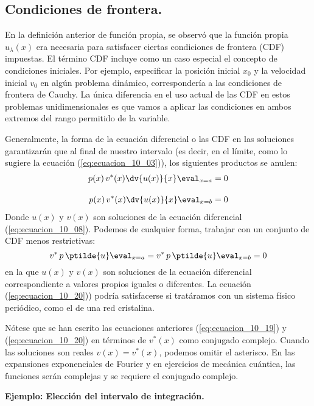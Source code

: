 \subsection{Condiciones de frontera.}
En la definición anterior de función propia, se observó que la función propia $u_{\lambda} (x)$ era necesaria para satisfacer ciertas condiciones de frontera (CDF) impuestas. El término CDF incluye como un caso especial el concepto de condiciones iniciales. Por ejemplo, especificar la posición inicial $x_{0}$ y la velocidad inicial $v_{0}$ en algún problema dinámico, correspondería a las condiciones de frontera de Cauchy. La única diferencia en el uso actual de las CDF en estos problemas unidimensionales es que vamos a aplicar las condiciones en ambos extremos del rango permitido de la variable.
\par
Generalmente, la forma de la ecuación diferencial o las CDF en las soluciones garantizarán que al final de nuestro intervalo (es decir, en el límite, como lo sugiere la ecuación (\ref{eq:ecuacion_10_03})), los siguientes productos se anulen:
\begin{align}
\begin{aligned}
p(x) \, v^{*}(x) \dv{u(x)}{x} \eval_{x = a} = 0 \\[1em]
p(x) \, v^{*}(x) \dv{u(x)}{x} \eval_{x = b} = 0
\label{eq:ecuacion_10_19}
\end{aligned}
\end{align}
Donde $u(x)$ y $v(x)$ son soluciones de la ecuación diferencial (\ref{eq:ecuacion_10_08}). Podemos de cualquier forma, trabajar con un conjunto de CDF menos restrictivas:
\begin{equation}
v^{*} \, p \, \ptilde{u} \eval_{x = a} = v^{*} \, p \, \ptilde{u} \eval_{x = b} = 0
\label{eq:ecuacion_10_20}
\end{equation}
en la que $u(x)$ y $v(x)$ son soluciones de la ecuación diferencial correspondiente a valores propios iguales o diferentes. La ecuación (\ref{eq:ecuacion_10_20})) podría satisfacerse si tratáramos con un sistema físico periódico, como el de una red cristalina.
\par
Nótese que se han escrito las ecuaciones anteriores  (\ref{eq:ecuacion_10_19}) y (\ref{eq:ecuacion_10_20}) en términos de $v^{*}(x)$ como conjugado complejo. Cuando las soluciones son reales $v(x) = v^{*}(x)$, podemos omitir el asterisco. En las expansiones exponenciales de Fourier y en ejercicios de mecánica cuántica, las funciones serán complejas y se requiere el conjugado complejo.
\par
\textbf{Ejemplo: Elección del intervalo de integración.}

